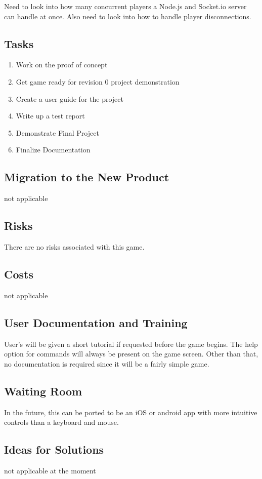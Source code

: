 \documentclass[12pt]{article}
\begin{document}
Need to look into how many concurrent players a Node.js and Socket.io server can handle at once. Also need to look into how to handle player disconnections.
\subsection{Tasks}
\begin{enumerate}
\item Work on the proof of concept
\item Get game ready for revision 0 project demonstration
\item Create a user guide for the project
\item Write up a test report
\item Demonstrate Final Project
\item Finalize Documentation
\end{enumerate}
\subsection{Migration to the New Product}
not applicable
\subsection{Risks}
There are no risks associated with this game.
\subsection{Costs}
not applicable
\subsection{User Documentation and Training}
User’s will be given a short tutorial if requested before the game begins. The help option for commands will always be present on the game screen. Other than that, no documentation is required since it will be a fairly simple game.
\subsection{Waiting Room}
In the future, this can be ported to be an iOS or android app with more intuitive controls than a keyboard and mouse.
\subsection{Ideas for Solutions}
not applicable at the moment
\end{document}
